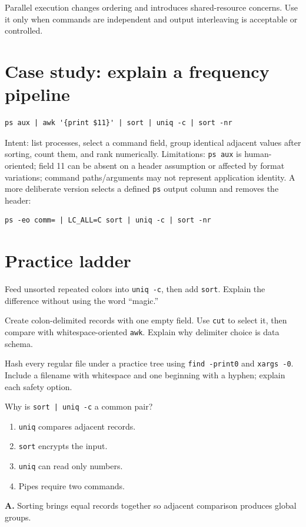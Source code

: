 \documentclass[11pt,oneside,openany]{book}
\newcommand{\fourchoices}[4]{%
  \begin{enumerate}[label=\Alph*),leftmargin=2em,itemsep=0.25em]
    \item #1
    \item #2
    \item #3
    \item #4
  \end{enumerate}}
\begin{document}
Parallel execution changes ordering and introduces shared-resource concerns. Use it only when commands are independent and output interleaving is acceptable or controlled.

\section{Case study: explain a frequency pipeline}
\begin{lstlisting}
ps aux | awk '{print $11}' | sort | uniq -c | sort -nr
\end{lstlisting}
Intent: list processes, select a command field, group identical adjacent values after sorting, count them, and rank numerically. Limitations: \texttt{ps aux} is human-oriented; field 11 can be absent on a header assumption or affected by format variations; command paths/arguments may not represent application identity. A more deliberate version selects a defined \texttt{ps} output column and removes the header:
\begin{lstlisting}
ps -eo comm= | LC_ALL=C sort | uniq -c | sort -nr
\end{lstlisting}

\section{Practice ladder}
\begin{practicebox}[title={Easy -- adjacent uniqueness}]
Feed unsorted repeated colors into \texttt{uniq -c}, then add \texttt{sort}. Explain the difference without using the word “magic.”
\end{practicebox}
\begin{practicebox}[title={Medium -- field contract}]
Create colon-delimited records with one empty field. Use \texttt{cut} to select it, then compare with whitespace-oriented \texttt{awk}. Explain why delimiter choice is data schema.
\end{practicebox}
\begin{practicebox}[title={Hard -- NUL pipeline}]
Hash every regular file under a practice tree using \texttt{find -print0} and \texttt{xargs -0}. Include a filename with whitespace and one beginning with a hyphen; explain each safety option.
\end{practicebox}

\begin{questionbox}[title={Medium 11.1 -- \texttt{uniq}}]
Why is \texttt{sort | uniq -c} a common pair?
\fourchoices{\texttt{uniq} compares adjacent records.}{\texttt{sort} encrypts the input.}{\texttt{uniq} can read only numbers.}{Pipes require two commands.}
\end{questionbox}
\begin{answerbox}
\textbf{A.} Sorting brings equal records together so adjacent comparison produces global groups.
\end{answerbox}
\end{document}
